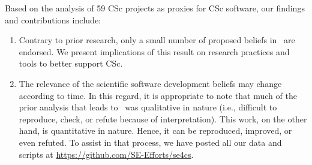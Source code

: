 \documentclass[conference,10pt]{IEEEtran}
\newcommand{\bi}{\begin{itemize}}
\newcommand{\be}{\begin{enumerate}}
\newcommand{\ee}{\end{enumerate}}
\begin{document}
Based on the analysis of 59 CSc projects as proxies for CSc software, our findings and contributions include: 
\be
\item Contrary to prior research, only a small number of proposed beliefs in~\cite{johan18_secs} are endorsed. We present implications of this result on research practices and tools to better support CSc. 
\item The relevance of the scientific software development beliefs may change according to time.
In this regard, it is appropriate to note that
  much of the prior analysis that leads to~ was qualitative in nature (i.e., difficult to reproduce, check, or refute because of interpretation). This work, on the other hand, is quantitative in nature. Hence, it can be reproduced, improved, or even refuted.  To assist in that process, we have posted all our data and scripts at
\url{https://github.com/SE-Efforts/se4cs}. 
\ee



\end{document}

